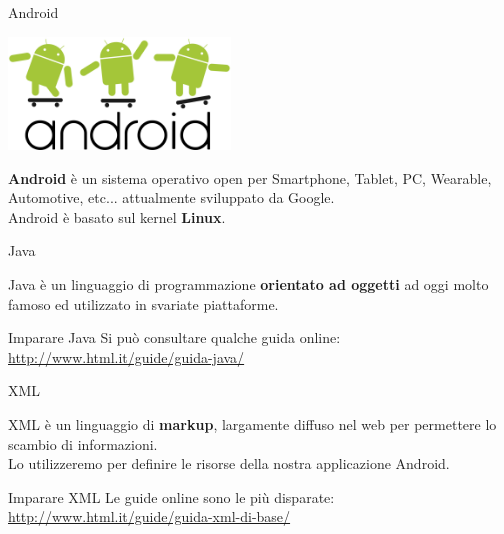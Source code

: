 \documentclass[xcolor=svgnames,11pt]{beamer}
\begin{document}
\begin{frame}[fragile]{Android}

\begin{center}
\includegraphics[height=3cm]{android_logo.pdf}
\end{center}
\pause
\textbf{Android} \`e un sistema operativo open per Smartphone, Tablet, PC, Wearable, Automotive, etc... attualmente sviluppato da Google.\\
\pause
Android \`e basato sul kernel \textbf{Linux}.
\end{frame}

\begin{frame}{Java}

Java \`e un linguaggio di programmazione \textbf{orientato ad oggetti} ad oggi molto famoso ed utilizzato in svariate piattaforme.
\pause
\begin{center}
\end{center}
\pause
\begin{block}{Imparare Java}
Si pu\`o consultare qualche guida online: \url{ http://www.html.it/guide/guida-java/}
\end{block}

\end{frame}

\begin{frame}{XML}

XML \`e un linguaggio di \textbf{markup}, largamente diffuso nel web per permettere lo scambio di informazioni.\\
\pause
\medskip
Lo utilizzeremo per definire le risorse della nostra applicazione Android.\\
\medskip
\pause
\begin{block}{Imparare XML}
Le guide online sono le pi\`u disparate: \url{http://www.html.it/guide/guida-xml-di-base/}
\end{block}

\end{frame}
\end{document}
